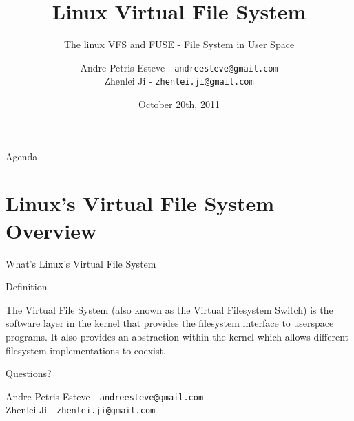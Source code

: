 \documentclass{beamer}
\author[Andre Esteve and Zhenlei Ji]{
Andre Petris Esteve - \texttt{andreesteve@gmail.com}\\
Zhenlei Ji - \texttt{zhenlei.ji@gmail.com}}
\institute[IC\textbackslash UNICAMP]{
MC806 - Operational System Topics\\}
\title[Linux VFS]{Linux Virtual File System}
\subtitle[]{The linux VFS and FUSE - File System in User Space}
\date[10/20/2011]{October 20th, 2011}
\begin{document}

\begin{frame}[plain]
  \titlepage
\end{frame}

\begin{frame}{Agenda}
  \tableofcontents
\end{frame}

\section{Linux's Virtual File System Overview}

\begin{frame}{What's Linux's Virtual File System}

  \begin{block}{Definition}

	The Virtual File System (also known as the Virtual Filesystem Switch)
	is the software layer in the kernel that provides the filesystem
	interface to userspace programs. It also provides an abstraction
	within the kernel which allows different filesystem implementations to
	coexist. \footnotemark

  \end{block}


\end{frame}



\begin{frame}[plain]

  \begin{center}
    \Huge Questions?
  \end{center}

  \vspace{0.2in}

  \begin{center}
	Andre Petris Esteve - \texttt{andreesteve@gmail.com}\\
	Zhenlei Ji - \texttt{zhenlei.ji@gmail.com}
  \end{center}
\end{frame}
\end{document}
